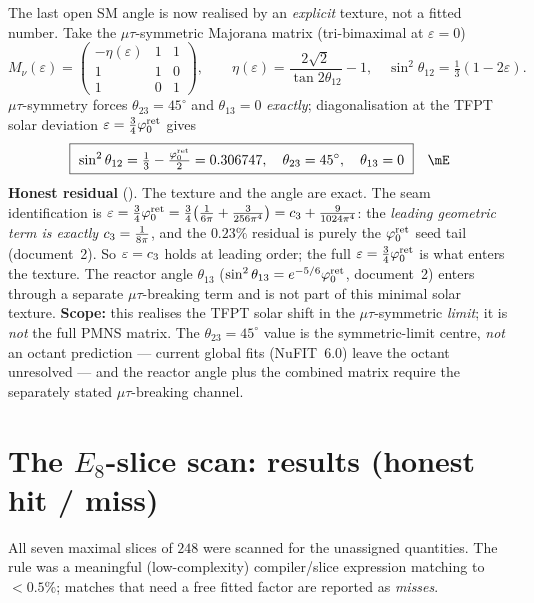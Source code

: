 \begin{winbox}
The last open SM angle is now realised by an \emph{explicit} texture, not a fitted number. Take the
$\mu\tau$-symmetric Majorana matrix (tri-bimaximal at $\varepsilon{=}0$)
\begin{equation}
  M_\nu(\varepsilon)=\begin{pmatrix}-\eta(\varepsilon)&1&1\\ 1&1&0\\ 1&0&1\end{pmatrix},\qquad
  \eta(\varepsilon)=\frac{2\sqrt2}{\tan2\theta_{12}}-1,\quad
  \sin^2\theta_{12}=\tfrac13(1-2\varepsilon).
\end{equation}
$\mu\tau$-symmetry forces $\theta_{23}=45^\circ$ and $\theta_{13}=0$ \emph{exactly}; diagonalisation at the
TFPT solar deviation $\varepsilon=\tfrac34\varphi_0^{\mathrm{ret}}$ gives
\begin{equation}
  \boxed{\ \sin^2\theta_{12}=\tfrac13-\tfrac{\phiz}{2}=0.306747,\quad
  \theta_{23}=45^\circ,\quad \theta_{13}=0\ }\quad\mE
\end{equation}
\textbf{Honest residual} (). The texture and the angle are exact. The seam identification is
$\varepsilon=\tfrac34\varphi_0^{\mathrm{ret}}=\tfrac34\bigl(\tfrac1{6\pi}+\tfrac3{256\pi^4}\bigr)=c_3+\tfrac{9}{1024\pi^4}$:
the \emph{leading geometric term is exactly} $c_3=\tfrac1{8\pi}$, and the $0.23\%$ residual is purely the
$\varphi_0^{\mathrm{ret}}$ seed tail (document~2). So $\varepsilon=c_3$ holds at leading order; the full
$\varepsilon=\tfrac34\varphi_0^{\mathrm{ret}}$ is what enters the texture. The reactor angle $\theta_{13}$
($\sin^2\theta_{13}=e^{-5/6}\varphi_0^{\mathrm{ret}}$, document~2) enters through a separate $\mu\tau$-breaking term and is not
part of this minimal solar texture. \textbf{Scope:} this realises the TFPT solar shift in the
$\mu\tau$-symmetric \emph{limit}; it is \emph{not} the full PMNS matrix. The $\theta_{23}{=}45^\circ$ value
is the symmetric-limit centre, \emph{not} an octant prediction --- current global fits (NuFIT~6.0) leave
the octant unresolved --- and the reactor angle plus the combined matrix require the separately stated
$\mu\tau$-breaking channel.
\end{winbox}

\section{The $E_8$-slice scan: results (honest hit / miss)}
All seven maximal slices of $248$ were scanned for the unassigned quantities. The rule was a meaningful
(low-complexity) compiler/slice expression matching to $<0.5\%$; matches that need a free fitted factor
are reported as \emph{misses}.

